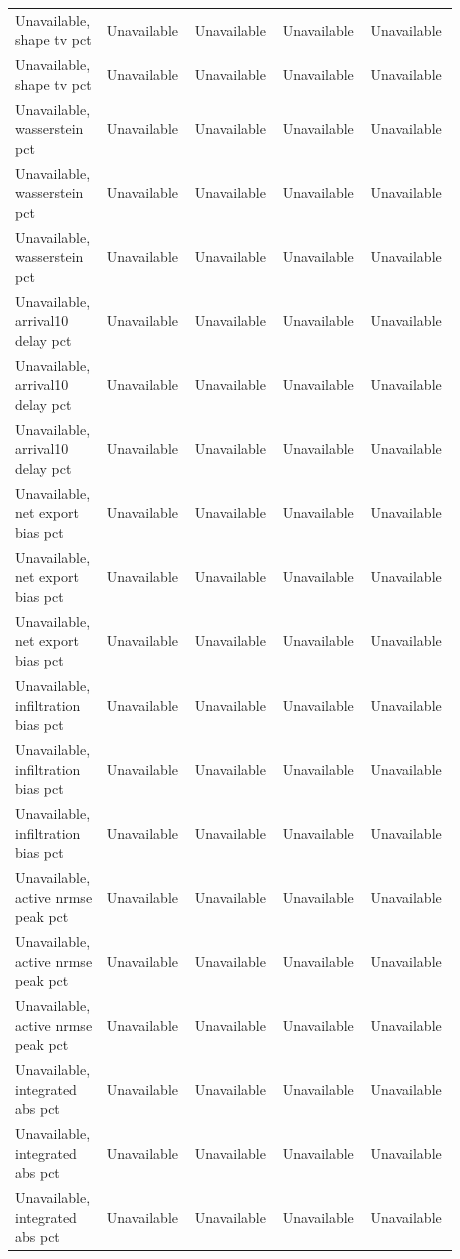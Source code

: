 \begin{longtable}{p{0.1760\linewidth}p{0.1760\linewidth}p{0.1760\linewidth}p{0.1760\linewidth}p{0.1760\linewidth}}
Unavailable, shape tv pct & Unavailable & Unavailable & Unavailable & Unavailable \\
Unavailable, shape tv pct & Unavailable & Unavailable & Unavailable & Unavailable \\
Unavailable, wasserstein pct & Unavailable & Unavailable & Unavailable & Unavailable \\
Unavailable, wasserstein pct & Unavailable & Unavailable & Unavailable & Unavailable \\
Unavailable, wasserstein pct & Unavailable & Unavailable & Unavailable & Unavailable \\
Unavailable, arrival10 delay pct & Unavailable & Unavailable & Unavailable & Unavailable \\
Unavailable, arrival10 delay pct & Unavailable & Unavailable & Unavailable & Unavailable \\
Unavailable, arrival10 delay pct & Unavailable & Unavailable & Unavailable & Unavailable \\
Unavailable, net export bias pct & Unavailable & Unavailable & Unavailable & Unavailable \\
Unavailable, net export bias pct & Unavailable & Unavailable & Unavailable & Unavailable \\
Unavailable, net export bias pct & Unavailable & Unavailable & Unavailable & Unavailable \\
Unavailable, infiltration bias pct & Unavailable & Unavailable & Unavailable & Unavailable \\
Unavailable, infiltration bias pct & Unavailable & Unavailable & Unavailable & Unavailable \\
Unavailable, infiltration bias pct & Unavailable & Unavailable & Unavailable & Unavailable \\
Unavailable, active nrmse peak pct & Unavailable & Unavailable & Unavailable & Unavailable \\
Unavailable, active nrmse peak pct & Unavailable & Unavailable & Unavailable & Unavailable \\
Unavailable, active nrmse peak pct & Unavailable & Unavailable & Unavailable & Unavailable \\
Unavailable, integrated abs pct & Unavailable & Unavailable & Unavailable & Unavailable \\
Unavailable, integrated abs pct & Unavailable & Unavailable & Unavailable & Unavailable \\
Unavailable, integrated abs pct & Unavailable & Unavailable & Unavailable & Unavailable \\

\end{longtable}
